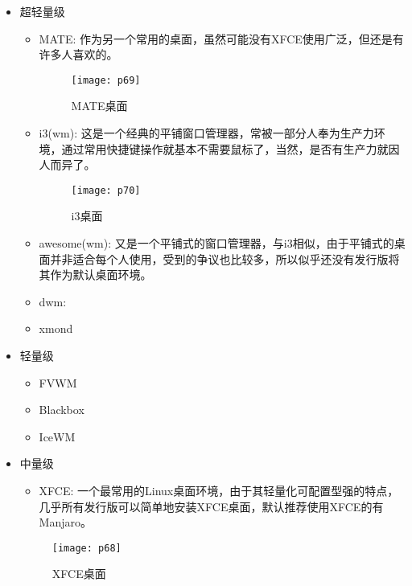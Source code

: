 \documentclass[utf8]{book}
\begin{document}
	\begin{itemize}
	\item 超轻量级
		\begin{itemize}

		\item MATE: 作为另一个常用的桌面，虽然可能没有XFCE使用广泛，但还是有许多人喜欢的。
		\begin{figure}[H]
			\centering
			\texttt{[image: p69]}
			\caption{MATE桌面}
		\end{figure}
		\item i3(wm):   这是一个经典的平铺窗口管理器，常被一部分人奉为生产力环境，通过常用快捷键操作就基本不需要鼠标了，当然，是否有生产力就因人而异了。
		\begin{figure}[H]
			\centering
			\texttt{[image: p70]}
			\caption{i3桌面}
		\end{figure}
		\item awesome(wm):    又是一个平铺式的窗口管理器，与i3相似，由于平铺式的桌面并非适合每个人使用，受到的争议也比较多，所以似乎还没有发行版将其作为默认桌面环境。
		\item dwm:
		\item xmond
		\end{itemize}
	\item 轻量级
		\begin{itemize}
		\item FVWM
		\item Blackbox
		\item IceWM
		\end{itemize}
	\item 中量级
	
		\begin{itemize}
			\item XFCE:    一个最常用的Linux桌面环境，由于其轻量化可配置型强的特点，几乎所有发行版可以简单地安装XFCE桌面，默认推荐使用XFCE的有Manjaro。
		\end{itemize}
	\begin{figure}[H]
		\centering
		\texttt{[image: p68]}
		\caption{XFCE桌面}
	\end{figure}


\end{itemize}
\end{document}
